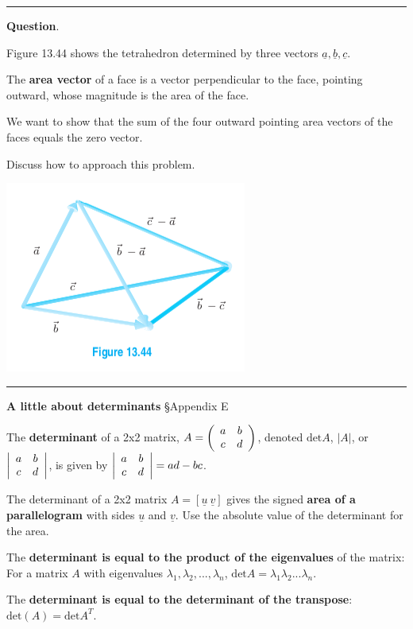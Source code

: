 \documentclass[12pt,letterpaper,noanswers]{exam}
\newcommand{\mb}[1]{\underline{#1}}
\begin{document}
\hrule
\vspace{0.2cm}


\noindent\textbf{Question}.

Figure 13.44 shows the tetrahedron determined by three vectors $\mb{a}, \mb{b}, \mb{c}$.

\begin{tcolorbox}
The \textbf{area vector} of a face is a vector perpendicular to the face, pointing outward, whose magnitude is the area of the face. 
\end{tcolorbox}

We want to show that the sum of the four outward pointing area vectors of the faces equals the zero vector.  

\noindent Discuss how to approach this problem.

\includegraphics[scale=0.4]{img/C05tetrahedron.png}

\vspace{1in}

\vspace{0.2cm}
\hrule
\vspace{0.2cm}

\eject
\noindent\textbf{A little about determinants} \S Appendix E
\begin{tcolorbox}
The \textbf{determinant} of a 2x2 matrix, $A = \left(\begin{array}{c c} a & b \\ c & d \end{array}\right)$, denoted $\text{det} A$, $\left\vert A\right\vert$, or $\left\vert\begin{array}{c c} a & b \\ c & d \end{array}\right\vert$, is given by $\left\vert\begin{array}{c c} a & b \\ c & d \end{array}\right\vert = ad - bc$.

The determinant of a 2x2 matrix $A = \left[\mb{u}\ \mb{v} \right]$ gives the signed \textbf{area of a parallelogram} with sides $\mb{u}$ and $\mb{v}$.  Use the absolute value of the determinant for the area.

The \textbf{determinant is equal to the product of the eigenvalues} of the matrix: For a matrix $A$ with eigenvalues $\lambda_1, \lambda_2,...,\lambda_n$, $\text{det}A = \lambda_1\lambda_2...\lambda_n.$

The \textbf{determinant is equal to the determinant of the transpose}: $\text{det}(A) = \text{det}A^T$.
\end{tcolorbox}
\end{document}

